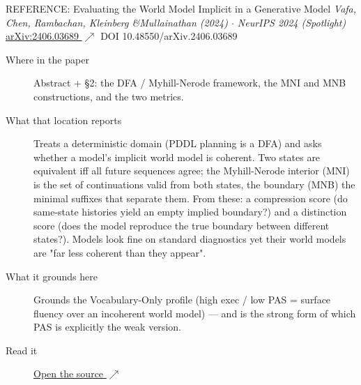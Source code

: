 \begin{bmmcard}{REFERENCE: Evaluating the World Model Implicit in a Generative Model}
\emph{Vafa, Chen, Rambachan, Kleinberg \&Mullainathan (2024) \(\cdot\) NeurIPS 2024 (Spotlight)}
\href{https://arxiv.org/abs/2406.03689}{arXiv:2406.03689 \(\nearrow\)} DOI 10.48550/arXiv.2406.03689
\begin{description}
\item[Where in the paper] Abstract + \S{}2: the DFA / Myhill-Nerode framework, the MNI and MNB constructions, and the two metrics.
\item[What that location reports] Treats a deterministic domain (PDDL planning is a DFA) and asks whether a model's implicit world model is coherent. Two states are equivalent iff all future sequences agree; the Myhill-Nerode interior (MNI) is the set of continuations valid from both states, the boundary (MNB) the minimal suffixes that separate them. From these: a compression score (do same-state histories yield an empty implied boundary?) and a distinction score (does the model reproduce the true boundary between different states?). Models look fine on standard diagnostics yet their world models are "far less coherent than they appear".
\item[What it grounds here] Grounds the Vocabulary-Only profile (high exec / low PAS = surface fluency over an incoherent world model) --- and is the strong form of which PAS is explicitly the weak version.
\item[Read it] \href{https://arxiv.org/abs/2406.03689}{Open the source \(\nearrow\)}
\end{description}
\end{bmmcard}

